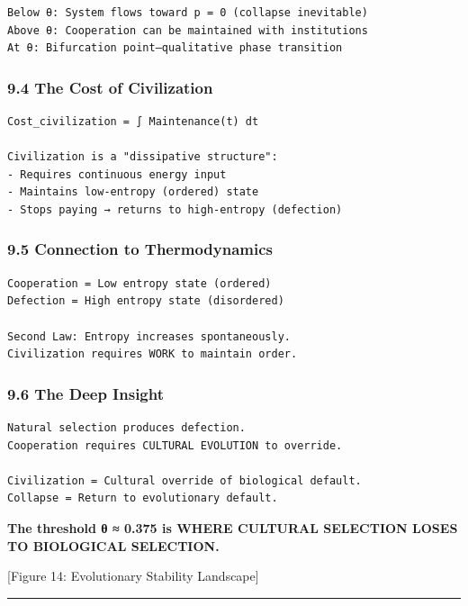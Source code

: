 \documentclass[11pt,letterpaper]{article}
\begin{document}
\begin{verbatim}
Below θ: System flows toward p = 0 (collapse inevitable)
Above θ: Cooperation can be maintained with institutions
At θ: Bifurcation point—qualitative phase transition
\end{verbatim}

\subsubsection{9.4 The Cost of
Civilization}\label{the-cost-of-civilization}

\begin{verbatim}
Cost_civilization = ∫ Maintenance(t) dt

Civilization is a "dissipative structure":
- Requires continuous energy input
- Maintains low-entropy (ordered) state
- Stops paying → returns to high-entropy (defection)
\end{verbatim}

\subsubsection{9.5 Connection to
Thermodynamics}\label{connection-to-thermodynamics}

\begin{verbatim}
Cooperation = Low entropy state (ordered)
Defection = High entropy state (disordered)

Second Law: Entropy increases spontaneously.
Civilization requires WORK to maintain order.
\end{verbatim}

\subsubsection{9.6 The Deep Insight}\label{the-deep-insight}

\begin{verbatim}
Natural selection produces defection.
Cooperation requires CULTURAL EVOLUTION to override.

Civilization = Cultural override of biological default.
Collapse = Return to evolutionary default.
\end{verbatim}

\textbf{The threshold θ ≈ 0.375 is WHERE CULTURAL SELECTION LOSES TO
BIOLOGICAL SELECTION.}

{[}Figure 14: Evolutionary Stability Landscape{]}

\begin{center}\rule{0.5\linewidth}{0.5pt}\end{center}
\end{document}
